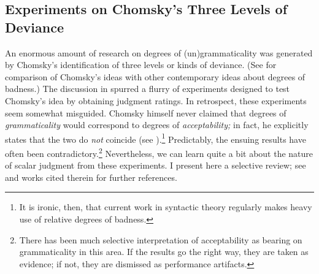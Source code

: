 \subsection{Experiments on Chomsky's Three Levels of Deviance}\label{sec:3.3.2}

An enormous amount of research on degrees of (un)grammaticality was generated by Chomsky's identification of three levels or kinds of deviance. (See \citet{Schnitser1973} for comparison of Chomsky's ideas with other contemporary ideas about degrees of badness.) The discussion in \aspectsq spurred a flurry of experiments designed to test Chomsky's idea by obtaining judgment ratings. In retrospect, these experiments seem somewhat misguided. Chomsky himself never claimed that degrees of \textit{grammaticality} would correspond to degrees of \textit{acceptability;} in fact, he explicitly states that the two do \textit{not} coincide (see ).\footnote{It is ironic, then, that current work in syntactic theory regularly makes heavy use of relative degrees of badness.}
 Predictably, the ensuing results have often been contradictory.\footnote{There has been much selective interpretation of acceptability as bearing on grammaticality in this area. If the results go the right way, they are taken as evidence; if not, they are dismissed as performance artifacts.}
 Nevertheless, we can learn quite a bit about the nature of scalar judgment from these experiments. I present here a selective review; see \citet{Moore1972} and works cited therein for further references.
 


